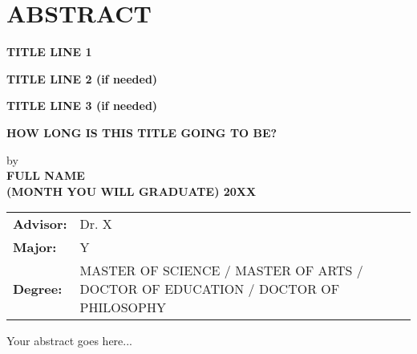 \section*{ABSTRACT}

\centerline{\bf TITLE LINE 1}
\vspace{-0.4cm}
\centerline{\bf TITLE LINE 2 (if needed)}
\vspace{-0.4cm}
\centerline{\bf TITLE LINE 3 (if needed)}
\vspace{-0.4cm}
\centerline{\bf HOW LONG IS THIS TITLE GOING TO BE?}

{\setlength\baselineskip{0.3in}
\begin{center}
by\\
\medskip
{\bf FULL NAME}\\
\medskip
{\bf (MONTH YOU WILL GRADUATE) 20XX}\\
\end{center}
\Vspc
\begin{tabular}{ll}
	{\bf Advisor:} & Dr. X \\
	{\bf Major:} & Y \\
	{\bf Degree:} & MASTER OF SCIENCE / MASTER OF ARTS / DOCTOR OF EDUCATION / DOCTOR OF PHILOSOPHY
\end{tabular}
}

\bigskip \bigskip

Your abstract goes here...